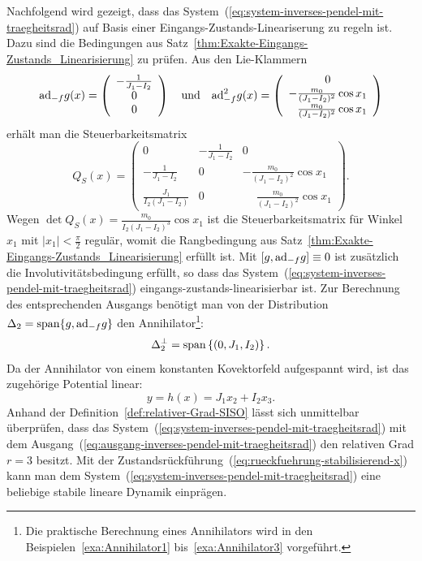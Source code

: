Nachfolgend wird gezeigt, dass das System~(\ref{eq:system-inverses-pendel-mit-traegheitsrad})
auf Basis einer Eingangs-Zustands-Lineariserung zu regeln ist. Dazu
sind die Bedingungen aus Satz~\ref{thm:Exakte-Eingangs-Zustands_Linearisierung}
zu prüfen. Aus den Lie-Klammern 
\[
{\operatorname{ad}}_{-f}g(x)=\left(\begin{array}{c}
-\frac{1}{J_{1}-I_{2}}\\
0\\
0
\end{array}\right)\quad\text{und}\quad{\operatorname{ad}}_{-f}^{2}g(x)=\left(\begin{array}{c}
0\\
-\frac{m_{0}}{(J_{1}-I_{2})^{2}}\cos x_{1}\\
\phantom{-}\frac{m_{0}}{(J_{1}-I_{2})^{2}}\cos x_{1}
\end{array}\right)
\]
erhält man die Steuerbarkeitsmatrix 
\begin{equation}
Q_{S}(x)=\left(\begin{array}{ccc}
0 & -\frac{1}{J_{1}-I_{2}} & 0\\
-\frac{1}{J_{1}-I_{2}} & 0 & -\frac{m_{0}}{(J_{1}-I_{2})^{2}}\cos x_{1}\\
\frac{J_{1}}{I_{2}(J_{1}-I_{2})} & 0 & \phantom{-}\frac{m_{0}}{(J_{1}-I_{2})^{2}}\cos x_{1}
\end{array}\right).\label{eq:QS-inv-pendel-rad}
\end{equation}
Wegen $\det Q_{S}(x)=\frac{m_{0}}{I_{2}(J_{1}-I_{2})^{3}}\cos x_{1}$
ist die Steuerbarkeitsmatrix für Winkel~$x_{1}$ mit $|x_{1}|<\tfrac{\pi}{2}$
regulär, womit die Rangbedingung aus Satz~\ref{thm:Exakte-Eingangs-Zustands_Linearisierung}
erfüllt ist. Mit $[g,{\operatorname{ad}}_{-f}g]\equiv0$ ist zusätzlich die Involutivitätsbedingung
erfüllt, so dass das System~(\ref{eq:system-inverses-pendel-mit-traegheitsrad})
eingangs-zustands-linearisierbar ist. Zur Berechnung des entsprechenden
Ausgangs benötigt man von der Distribution $\Delta_{2}={\operatorname{span}}\{g,{\operatorname{ad}}_{-f}g\}$
den Annihilator\footnote{Die praktische Berechnung eines Annihilators wird in den Beispielen~\ref{exa:Annihilator1}
bis~\ref{exa:Annihilator3} vorgeführt.}: 
\[
\Delta_{2}^{\perp}={\operatorname{span}}\left\{ \left(0,J_{1},I_{2}\right)\right\} .
\]
Da der Annihilator von einem konstanten Kovektorfeld aufgespannt wird,
ist das zugehörige Potential linear: 
\begin{equation}
y=h(x)=J_{1}x_{2}+I_{2}x_{3}.\label{eq:ausgang-inverses-pendel-mit-traegheitsrad}
\end{equation}
Anhand der Definition~\ref{def:relativer-Grad-SISO} lässt sich unmittelbar
überprüfen, dass das System~(\ref{eq:system-inverses-pendel-mit-traegheitsrad})
mit dem Ausgang~(\ref{eq:ausgang-inverses-pendel-mit-traegheitsrad})
den relativen Grad $r=3$ besitzt. Mit der Zustandsrückführung~(\ref{eq:rueckfuehrung-stabilisierend-x})
kann man dem System~(\ref{eq:system-inverses-pendel-mit-traegheitsrad})
eine beliebige stabile lineare Dynamik einprägen.

